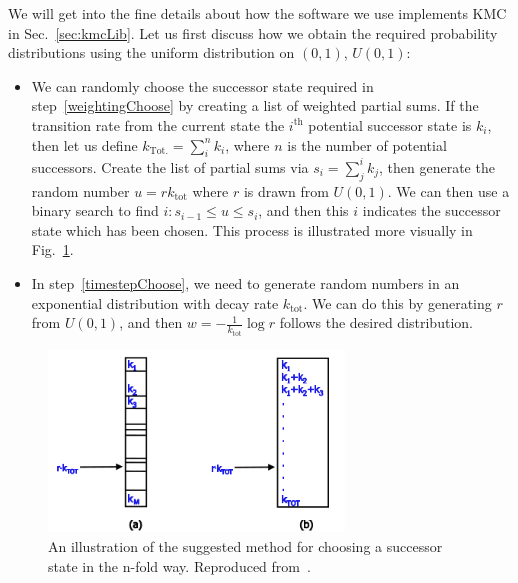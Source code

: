 We will get into the fine details about how the software we use implements KMC in Sec.~\ref{sec:kmcLib}.
Let us first discuss how we obtain the required probability distributions using the uniform distribution
on $(0, 1)$, $U(0, 1)$:
\begin{itemize}
 \item We can randomly choose the successor state required in step~\ref{weightingChoose} by
 creating a list of weighted partial sums. If the transition rate from the current state the $i^\mathrm{th}$
 potential successor state is $k_i$, then let us define $k_\mathrm{Tot.} = \sum_{i}^n k_i$, 
 where $n$ is the
 number of potential successors. Create the list of partial sums via $s_i = \sum_j^i k_j$, then generate
 the random number $u = r k_\mathrm{tot}$ where $r$ is drawn from $U(0, 1)$. We can then use a binary
 search to find $i: s_{i-1} \le u \le s_i$, and then this $i$ indicates the successor state which has been
 chosen. This process is illustrated more visually in Fig.~\ref{fig:weightChoice}.
 \item In step~\ref{timestepChoose}, we need to generate random numbers in an exponential distribution
 with decay rate $k_\mathrm{tot}$. We can do this by generating $r$ from $U(0, 1)$, and then 
 $w = -\frac{1}{k_\mathrm{tot}} \log{r}$
 follows the desired distribution.
\end{itemize}
\begin{figure}[h!]
 \caption[Illustration of the method for choosing successor states in the n-fold way.]{\label{fig:weightChoice} 
 An illustration of the suggested method for choosing a successor state in the n-fold way. Reproduced
 from~\cite{voterKMC}.
 }
  \begin{center}
 \includegraphics[width=0.7\textwidth]{numerics/images/nFoldWayRates}
  \end{center}
\end{figure}

